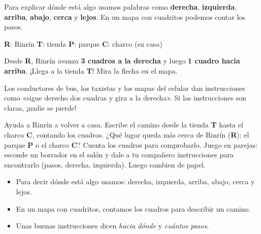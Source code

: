 \documentclass[11pt]{article}
\begin{document}
Para explicar dónde está algo usamos palabras como \textbf{derecha},
\textbf{izquierda}, \textbf{arriba}, \textbf{abajo}, \textbf{cerca} y
\textbf{lejos}. En un mapa con cuadritos podemos contar los pasos.

\begin{center}
\begin{minipage}{\linewidth}\centering   %

\medskip
{\small \textbf{R}: Rinrín \quad \textbf{T}: tienda \quad \textbf{P}: parque \quad \textbf{C}: charco (su casa)}
\end{minipage}
\end{center}

\begin{ejemplo}
Desde \textbf{R}, Rinrín avanza \textbf{3 cuadros a la derecha} y luego
\textbf{1 cuadro hacia arriba}. ¡Llega a la tienda \textbf{T}! Mira la
flecha en el mapa.
\end{ejemplo}

\begin{aplicacion}
Los conductores de bus, los taxistas y los mapas del celular dan
instrucciones como «sigue derecho dos cuadras y gira a la derecha». Si
las instrucciones son claras, ¡nadie se pierde!
\end{aplicacion}

\begin{preguntas}
\pregunta Ayuda a Rinrín a volver a casa. Escribe el camino desde la
tienda \textbf{T} hasta el charco \textbf{C}, contando los cuadros.
\pregunta ¿Qué lugar queda más cerca de Rinrín (\textbf{R}): el parque
\textbf{P} o el charco \textbf{C}? Cuenta los cuadros para comprobarlo.
\pregunta Juego en parejas: esconde un borrador en el salón y dale a tu
compañero instrucciones para encontrarlo (pasos, derecha, izquierda).
Luego cambien de papel.
\end{preguntas}

\begin{resumen}
\begin{itemize}
  \item Para decir dónde está algo usamos: derecha, izquierda, arriba,
        abajo, cerca y lejos.
  \item En un mapa con cuadritos, contamos los cuadros para describir un camino.
  \item Unas buenas instrucciones dicen \emph{hacia dónde} y \emph{cuántos pasos}.
\end{itemize}
\end{resumen}
\end{document}
